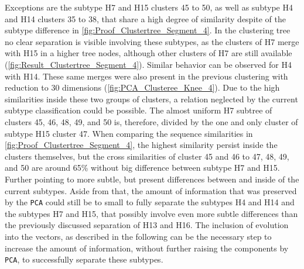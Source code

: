 \vspace{1em}

Exceptions are the subtype H7 and H15 clusters 45 to 50, as well as subtype H4 and H14 clusters 35 to 38, that share a high degree of similarity despite of the subtype difference in \autoref{fig:Proof_Clustertree_Segment_4}. In the clustering tree no clear separation is visible involving these subtypes, as the clusters of H7 merge with H15 in a higher tree nodes, although other clusters of H7 are still available (\autoref{fig:Result_Clustertree_Segment_4}). Similar behavior can be observed for H4 with H14. These same merges were also present in the previous clustering with reduction to 30 dimensions (\autoref{fig:PCA_Clusteree_Knee_4}). Due to the high similarities inside these two groups of clusters, a relation neglected by the current subtype classification could be possible. The almost uniform H7 subtree of clusters 45, 46, 48, 49, and 50 is, therefore, divided by the one and only cluster of subtype H15 cluster 47. When comparing the sequence similarities in \autoref{fig:Proof_Clustertree_Segment_4}, the highest similarity persist inside the clusters themselves, but the cross similarities of cluster 45 and 46 to 47, 48, 49, and 50 are around 65\% without big difference between subtype H7 and H15. Further pointing to more subtle, but present differences between and inside of the current subtypes. Aside from that, the amount of information that was preserved by the \texttt{PCA} could still be to small to fully separate the subtypes H4 and H14 and the subtypes H7 and H15, that possibly involve even more subtle differences than the previously discussed separation of H13 and H16. The inclusion of evolution into the vectors, as described in the following can be the necessary step to increase the amount of information, without further raising the components by \texttt{PCA}, to successfully separate these subtypes.

\vspace{1em}

